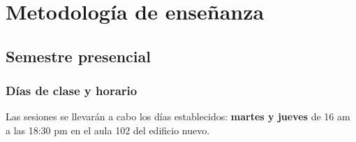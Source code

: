 \documentclass[12pt]{beamer}
\begin{document}
\section{Metodología de enseñanza}
\subsection{Semestre presencial}

\begin{frame}
\frametitle{Días de clase y horario}
Las sesiones se llevarán a cabo los días establecidos: \textbf{martes y jueves} de 16 am a las 18:30 pm en el aula 102 del edificio nuevo.
\end{frame}

\end{document}
